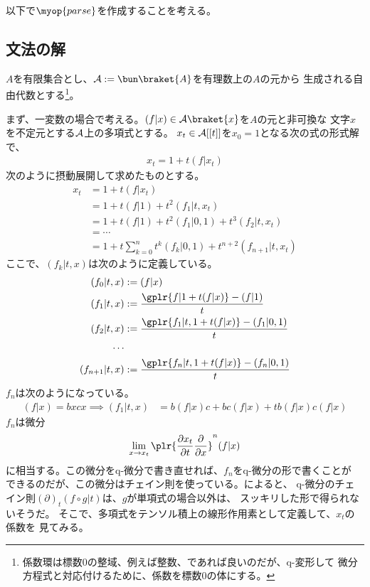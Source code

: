 {	以下で$\myop{parse}$を作成することを考える。
\subsection{文法の解}\label{s2:文法の解} %
	$A$を有限集合とし、$\calA:=\bun\braket{A}$を有理数上の$A$の元から
	生成される自由代数とする\footnote{
		係数環は標数$0$の整域、例えば整数、であれば良いのだが、q-変形して
		微分方程式と対応付けるために、係数を標数$0$の体にする。
	}。
	
	まず、一変数の場合で考える。$(f|x)\in\calA\braket{x}$を$A$の元と非可換な
	文字$x$を不定元とする$\mathcal{A}$上の多項式とする。
	$x_t\in\mathcal{A}[[t]]$を$x_0=1$となる次の式の形式解で、
	\begin{equation}\label{eq:一変数の文法}\begin{split}
		x_t = 1 + t(f|x_t)
	\end{split}\end{equation}
	次のように摂動展開して求めたものとする。
	\begin{equation}\label{eq:一変数の文法のTayler展開}\begin{split}
		x_t &= 1 + t(f|x_t) \\
		&= 1 + t(f|1) + t^2(f_1|t,x_t) \\
		&= 1 + t(f|1) + t^2(f_1|0,1) + t^3(f_2|t,x_t) \\
		&= \cdots \\
		&= 1 + t\sum_{k=0}^n t^k (f_k|0,1) + t^{n+2}(f_{n+1}|t,x_t)
	\end{split}\end{equation}
	ここで、$(f_k|t,x)$は次のように定義している。
	\begin{equation*}\begin{split}
		(f_0|t,x) &:= (f|x) \\
		(f_1|t,x) &:= \frac{\gplr{f|1+t(f|x)}-(f|1)}{t} \\
		(f_2|t,x) &:= \frac{\gplr{f_1|t,1+t(f|x)}-(f_1|0,1)}{t} \\
		\cdots \\
		(f_{n+1}|t,x) &:= \frac{\gplr{f_n|t,1+t(f|x)}-(f_n|0,1)}{t} \\
	\end{split}\end{equation*}
	$f_n$は次のようになっている。
	\begin{equation*}\begin{split}
		(f|x) = bxcx \implies (f_1|t,x) &= b(f|x)c + bc(f|x) + tb(f|x)c(f|x)
	\end{split}\end{equation*}
	$f_n$は微分
	\begin{equation*}\begin{split}
		\lim_{x\to x_t}\plr{\frac{\dif x_t}{\dif t}\frac{\dif}{\dif x}}^n(f|x)
	\end{split}\end{equation*}
	に相当する。この微分をq-微分で書き直せれば、$f_n$をq-微分の形で書くことが
	できるのだが、この微分はチェイン則を使っている。\cite{kac:2002}によると、
	q-微分のチェイン則$(\partial)_t(f\circ g|t)$は、$g$が単項式の場合以外は、
	スッキリした形で得られないそうだ。
	そこで、多項式をテンソル積上の線形作用素として定義して、$x_t$の係数を
	見てみる。
	
}
